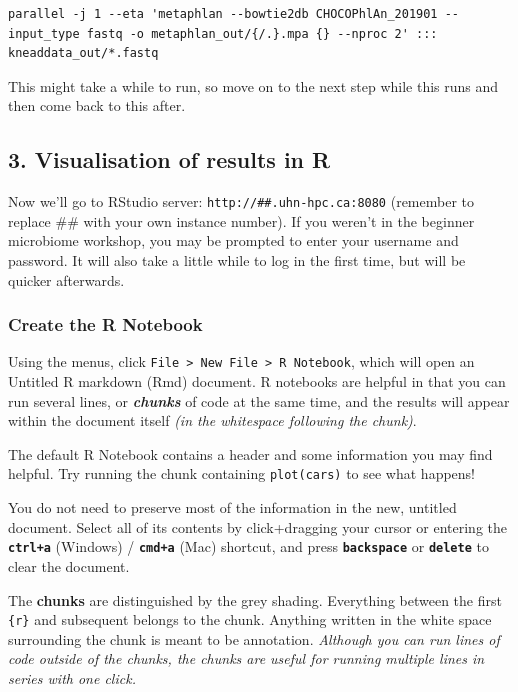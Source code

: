 \documentclass[
]{book}
\begin{document}
\begin{verbatim}
parallel -j 1 --eta 'metaphlan --bowtie2db CHOCOPhlAn_201901 --input_type fastq -o metaphlan_out/{/.}.mpa {} --nproc 2' ::: kneaddata_out/*.fastq
\end{verbatim}

This might take a while to run, so move on to the next step while this runs and then come back to this after.

\subsection{3. Visualisation of results in R}\label{visualisation-of-results-in-r}

Now we'll go to RStudio server: \texttt{http://\#\#.uhn-hpc.ca:8080} (remember to replace \#\# with your own instance number). If you weren't in the beginner microbiome workshop, you may be prompted to enter your username and password. It will also take a little while to log in the first time, but will be quicker afterwards.

\subsubsection{Create the R Notebook}\label{create-the-r-notebook}

Using the menus, click \texttt{File\ \textgreater{}\ New\ File\ \textgreater{}\ R\ Notebook}, which will open an Untitled R markdown (Rmd) document. R notebooks are helpful in that you can run several lines, or \textbf{\emph{chunks}} of code at the same time, and the results will appear within the document itself \emph{(in the whitespace following the chunk)}.

The default R Notebook contains a header and some information you may find helpful. Try running the chunk containing \texttt{plot(cars)} to see what happens!

You do not need to preserve most of the information in the new, untitled document. Select all of its contents by click+dragging your cursor or entering the \textbf{\texttt{ctrl+a}} (Windows) / \textbf{\texttt{cmd+a}} (Mac) shortcut, and press \textbf{\texttt{backspace}} or \textbf{\texttt{delete}} to clear the document.

The \textbf{chunks} are distinguished by the grey shading. Everything between the first \texttt{\textasciigrave{}\textasciigrave{}\textasciigrave{}\{r\}} and subsequent\texttt{\textasciigrave{}\textasciigrave{}\textasciigrave{}} belongs to the chunk. Anything written in the white space surrounding the chunk is meant to be annotation. \emph{Although you can run lines of code outside of the chunks, the chunks are useful for running multiple lines in series with one click.}
\end{document}
